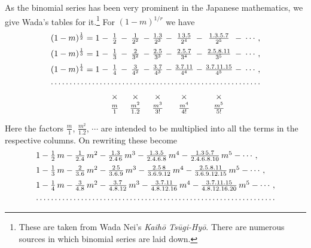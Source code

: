 \documentclass[11pt]{article}
\begin{document}
As the binomial series has been very prominent in the Japanese mathematics, we give Wada's tables for it.\footnote{These are taken from Wada Nei's \emph{Kaihō Tsūgi-Hyō}. There are numerous sources in which binomial series are laid down.} For $(1 - m)^{1/r}$ we have
\[
\begin{array}{r@{\;}c@{\;}c@{\;}c@{\;}c@{\;}c@{\;}c@{\;}c@{\;}c@{\;}c@{\;}c@{\;}l}
(1-m)^{\frac{1}{2}} = 1 & - & \frac{1}{2} & - & \frac{1}{2^2} & - & \frac{1.3}{2^3} & - & \frac{1\,3.5}{2^4} & - & \frac{1.3.5.7}{2^5} & -\;\cdots,\\[2mm]
(1-m)^{\frac{1}{3}} = 1 & - & \frac{1}{3} & - & \frac{2}{3^2} & - & \frac{2.5}{3^3} & - & \frac{2.5.7}{3^4} & - & \frac{2.5.8.11}{3^5} & -\;\cdots,\\[2mm]
(1-m)^{\frac{1}{4}} = 1 & - & \frac{1}{4} & - & \frac{3}{4^2} & - & \frac{3.7}{4^3} & - & \frac{3.7.11}{4^4} & - & \frac{3.7.11.15}{4^5} & -\;\cdots,\\[1mm]
\hdotsfor{12}\\[2mm]
 & & \times & & \times & & \times & & \times & & \times & \\
 & & \frac{m}{1} & & \frac{m^2}{1.2} & & \frac{m^3}{3!} & & \frac{m^4}{4!} & & \frac{m^5}{5!} &
\end{array}
\]

Here the factors $\frac{m}{1}$, $\frac{m^2}{1.2}$, $\cdots$ are intended to be multiplied into all the terms in the respective columns. On rewriting these become
\[
\begin{array}{l}
1 - \frac{1}{2}\,m - \frac{1}{2.4}\,m^2 - \frac{1.3}{2.4\,6}\,m^3 - \frac{1.3.5}{2.4.6.8}\,m^4 - \frac{1.3\,5.7}{2.4.6.8.10}\,m^5 - \cdots,\\[2mm]
1 - \frac{1}{3}\,m - \frac{2}{3.6}\,m^2 - \frac{2\,5}{3.6.9}\,m^3 - \frac{2.5\,8}{3.6.9.12}\,m^4 - \frac{2.5.8.11}{3.6.9.12.15}\,m^5 - \cdots,\\[2mm]
1 - \frac{1}{4}\,m - \frac{3}{4.8}\,m^2 - \frac{3.7}{4.8.12}\,m^3 - \frac{3.7.11}{4.8.12.16}\,m^4 - \frac{3.7.11.15}{4.8.12.16.20}\,m^5 - \cdots,\\[1mm]
\hdotsfor{1}
\end{array}
\]
\end{document}
